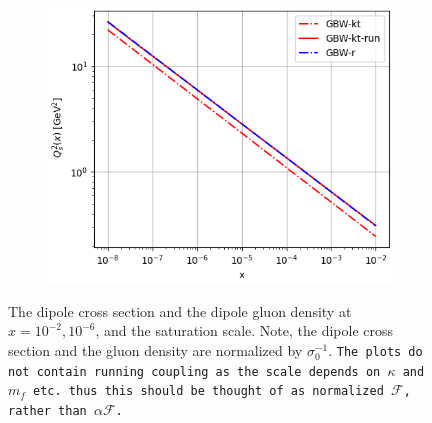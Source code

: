 \documentclass[11pt]{article}
\numberwithin{equation}{section}
\numberwithin{table}{section}
\numberwithin{figure}{section}
\newcommand{\comment}[1]{\texttt{\color{red}#1}}
\begin{document}
\begin{figure}[t]
\begin{subfigure}{0.32\textwidth}
\includegraphics[width=\textwidth]{./plots/GBW-saturation.png}
\end{subfigure}
\caption{The dipole cross section and the dipole gluon density at
$x=10^{-2}, 10^{-6}$, and the saturation scale. 
Note, the dipole cross section and the gluon density are normalized by $\sigma_0^{-1}$.
\comment{The plots do not contain running coupling as the scale depends on $\kappa$ and $m_f$ etc. thus this should be thought of as normalized $\mathcal{F}$, rather than $\alpha\mathcal{F}$.}}
\label{fig:GBW}
\end{figure}
\end{document}

